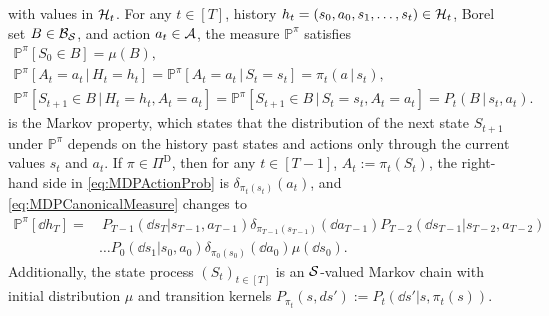 \documentclass[
    a4paper,
    11pt,
    bibliography=totoc,
    listof=totoc,      
    headinclude=true,
    cleardoublepage=empty,
]{scrbook}
\theoremstyle{plain}
\theoremstyle{definition}
\theoremstyle{remark}
\newcommand{\PM}{\mathbb P}
\newcommand{\SpaceS}{{\cal S}}
\newcommand{\SpaceA}{{\cal A}}
\newcommand{\SpaceH}{{\cal H}}
\begin{document}
with values in $\SpaceH_t$. For any $t\in[T]$, history $h_t = (s_0, a_0, s_1,
\dots, s_t) \in\SpaceH_t$, Borel set $B\in\mathcal{B}_\SpaceS$, and action
$a_t\in\SpaceA$, the measure $\PM^\pi$ satisfies
\begin{gather}
    \PM^\pi[S_0 \in B] = \mu(B), \\
    \label{eq:MDPActionProb}
    \PM^\pi[A_t = a_t \,|\, H_t = h_t] 
        = \PM^\pi[A_t = a_t \,|\, S_t = s_t] 
        = \pi_t(a\,|\,s_t), \\
    \label{eq:MDPMarkovNature}
    \PM^\pi[S_{t+1}\in B \,|\, H_t=h_t, A_t=a_t] 
        = \PM^\pi[S_{t+1}\in B \,|\, S_t=s_t, A_t=a_t] 
        = P_t(B\,|\,s_t,a_t).
\end{gather}
 is the Markov property, which states that the 
distribution of the next state $S_{t+1}$ under $\PM^\pi$ depends on the 
history past states and actions only through the current values $s_t$ and 
$a_t$.
If $\pi\in \Pi^\text{D}$, then for any $t\in[T-1]$, $A_t := \pi_t(S_t)$, the right-hand side in \cref{eq:MDPActionProb} is $\delta_{\pi_t(s_t)}(a_t)$, and \cref{eq:MDPCanonicalMeasure} changes to
\begin{equation*}
\begin{split}    
    \PM^\pi[\dd{h_T}] 
    = &\ P_{T-1}(\dd s_T | s_{T-1}, a_{T-1}) 
        \delta_{\pi_{T-1}(s_{T-1})}(\dd a_{T-1})
            P_{T-2}(\dd s_{T-1} | s_{T-2}, a_{T-2}) \\
    &\dots P_{0}(\dd s_1 | s_0, a_0) 
        \delta_{\pi_0(s_0)}(\dd a_0) 
            \mu(\dd s_0).
\end{split}
\end{equation*}
Additionally, the state process $(S_t)_{t\in[T]}$ is an $\SpaceS$-valued
Markov chain with initial distribution $\mu$ and transition kernels
$P_{\pi_t}(s, ds') := P_t(\dd s'|s,\pi_t(s))$.
\end{document}
